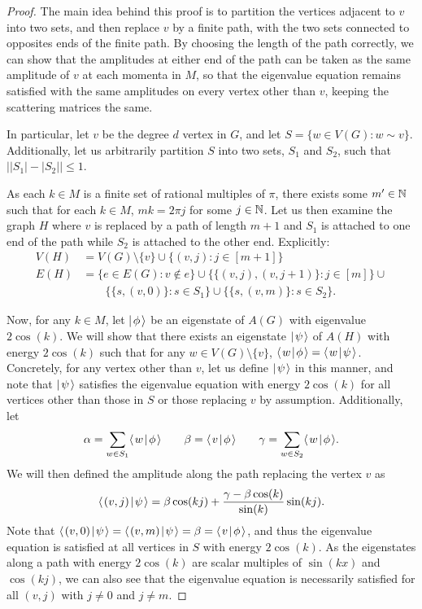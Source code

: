 \documentclass[../thesis-main/thesis-main]{subfiles}
\begin{document}
\begin{proof}
  The main idea behind this proof is to partition the vertices adjacent to $v$ into two sets, and then replace $v$ by a finite path, with the two sets connected to opposites ends of the finite path.  By choosing the length of the path correctly, we can show that the amplitudes at either end of the path can be taken as the same amplitude of $v$ at each momenta in $M$, so that the eigenvalue equation remains satisfied with the same amplitudes on every vertex other than $v$, keeping the scattering matrices the same.  
  
  In particular, let $v$ be the degree $d$ vertex in $G$, and let $S = \{w\in V(G) : w\sim v\}$.  Additionally, let us arbitrarily partition $S$ into two sets, $S_1$ and $S_2$, such that $\big||S_1|-|S_2|\big| \leq 1$.
  
  As each $k\in M$ is a finite set of rational multiples of $\pi$, there exists some $m'\in \mathbb{N}$ such that for each $k\in M$, $mk = 2\pi j$ for some $j\in \mathbb{N}$.  Let us then examine the graph $H$ where $v$ is replaced by a path of length $m+1$ and $S_1$ is attached to one end of the path while $S_2$ is attached to the other end.  Explicitly:
  \begin{align}
    V(H) &= V(G)\setminus \{v\} \cup \{(v,j): j\in [m+1]\}\\
    E(H) &= \big\{ e\in E(G) : v\notin e\big\} \cup \big\{ \{(v,j),(v,j+1)\} : j\in [m]\big\} \cup \nonumber\\
    &\qquad \big\{ \{s, (v,0)\} : s\in S_1\big\} \cup \big\{ \{s,(v,m)\} : s\in S_2\big\}.
  \end{align}
  
  Now, for any $k\in M$, let $|\mspace{2mu} \phi \mspace{2mu} \rangle$ be an eigenstate of $A(G)$ with eigenvalue $2\cos(k)$.  We will show that there exists an eigenstate $|\mspace{2mu} \psi \mspace{2mu} \rangle$ of $A(H)$ with energy $2\cos(k)$ such that for any $w\in V(G)\setminus \{v\}$, $\langle\mspace{2mu} w \mspace{2mu} | \mspace{2mu} \phi\mspace{2mu} \rangle = \langle\mspace{2mu} w \mspace{2mu} | \mspace{2mu} \psi\mspace{2mu} \rangle$.  Concretely, for any vertex other than $v$, let us define $|\mspace{2mu} \psi \mspace{2mu} \rangle$ in this manner, and note that $|\mspace{2mu} \psi \mspace{2mu} \rangle$ satisfies the eigenvalue equation with energy $2\cos(k)$ for all vertices other than those in $S$ or those replacing $v$ by assumption.  Additionally, let 
  \begin{equation}
    \alpha = \sum_{w\in S_1} \langle\mspace{2mu} w \mspace{2mu} | \mspace{2mu} \phi\mspace{2mu} \rangle \qquad \beta = \langle\mspace{2mu} v \mspace{2mu} | \mspace{2mu} \phi\mspace{2mu} \rangle \qquad \gamma = \sum_{w\in S_2} \langle\mspace{2mu} w \mspace{2mu} | \mspace{2mu} \phi\mspace{2mu} \rangle.
  \end{equation}
  We will then defined the amplitude along the path replacing the vertex $v$ as
  \begin{equation}
    \langle\mspace{2mu} (v,j) \mspace{2mu} | \mspace{2mu} \psi\mspace{2mu} \rangle = \beta \cos(k j) + \frac{\gamma - \beta\cos(k)}{\sin(k)} \sin( k j).
  \end{equation}
  Note that $\langle\mspace{2mu} (v,0) \mspace{2mu} | \mspace{2mu} \psi\mspace{2mu} \rangle = \langle\mspace{2mu} (v,m) \mspace{2mu} | \mspace{2mu} \psi\mspace{2mu} \rangle = \beta = \langle\mspace{2mu} v \mspace{2mu} | \mspace{2mu} \phi\mspace{2mu} \rangle$, and thus the eigenvalue equation is satisfied at all vertices in $S$ with energy $2\cos(k)$.  As the eigenstates along a path with energy $2\cos(k)$ are scalar multiples of $\sin(k x)$ and $\cos(k j)$, we can also see that the eigenvalue equation is necessarily satisfied for all $(v,j)$ with $j\neq 0$ and $j\neq m$.
  

\end{proof}
\end{document}
